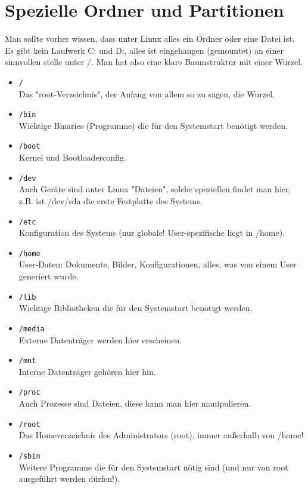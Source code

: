 \documentclass[a4paper,10pt]{article}
\begin{document}
  \section{Spezielle Ordner und Partitionen}
    Man sollte vorher wissen, dass unter Linux alles ein Ordner oder eine Datei ist. Es gibt kein Laufwerk C: und D:, alles ist eingehangen (gemountet) an einer sinnvollen stelle unter /. Man hat also eine klare Baumstruktur mit einer Wurzel.
    \begin{itemize}
      \item \texttt{/} \\ Das "root-Verzeichnis", der Anfang von allem so zu sagen, die Wurzel.
      \item \texttt{/bin} \\ Wichtige Binaries (Programme) die für den Systemstart benötigt werden.
      \item \texttt{/boot} \\ Kernel und Bootloaderconfig.
      \item \texttt{/dev} \\ Auch Geräte sind unter Linux "Dateien", solche speziellen findet man hier, z.B. ist /dev/sda die erste Festplatte des Systems.
      \item \texttt{/etc} \\ Konfiguration des Systems (nur globale! User-spezifische liegt in /home).
      \item \texttt{/home} \\  User-Daten: Dokumente, Bilder, Konfigurationen, alles, was von einem User generiert wurde.
      \item \texttt{/lib} \\ Wichtige Bibliotheken die für den Systemstart benötigt werden.
      \item \texttt{/media} \\ Externe Datenträger werden hier erscheinen.
      \item \texttt{/mnt} \\ Interne Datenträger gehören hier hin.
      \item \texttt{/proc} \\ Auch Prozesse sind Dateien, diese kann man hier manipulieren.
      \item \texttt{/root} \\ Das Homeverzeichnis des Administrators (root), immer außerhalb von /home!
      \item \texttt{/sbin} \\ Weitere Programme die für den Systemstart nötig sind (und nur von root ausgeführt werden dürfen!).

\end{itemize}
\end{document}
